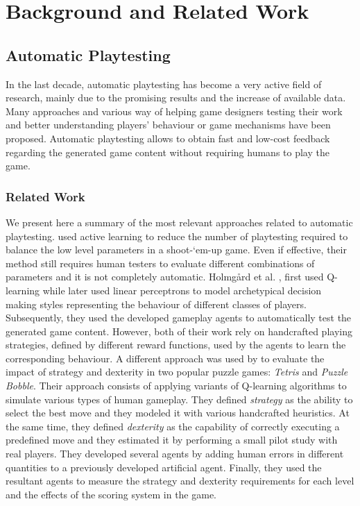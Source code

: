 \chapter{Background and Related Work}
\label{chap:background}
\section{Automatic Playtesting}
In the last decade, automatic playtesting has become a very active field of research, mainly due to the promising results and the increase of available data. Many approaches and various way of helping game designers testing their work and better understanding players' behaviour or game mechanisms have been proposed. Automatic playtesting allows to obtain fast and low-cost feedback regarding the generated game content without requiring humans to play the game.

\subsection{Related Work} \label{Automatic Playtesting Related Work}
We present here a summary of the most relevant approaches related to automatic playtesting. \textcite{zook_automatic_2014} used active learning to reduce the number of playtesting required to balance the low level parameters in a shoot-‘em-up game. Even if effective, their method still requires human testers to evaluate different combinations of parameters and it is not completely automatic. Holmgård et al. \cite{holmgard_evolving_2014}, first used Q-learning while later \cite{holmgard_evolving_2016} used linear perceptrons  to model archetypical decision making styles representing the behaviour of different classes of players. Subsequently, they used the developed gameplay agents to automatically test the generated game content. However, both of their work rely on handcrafted playing strategies, defined by different reward functions, used by the agents to learn the corresponding behaviour. A different approach was used by \textcite{isaksen_simulating_2017} to evaluate the impact of strategy and dexterity in two popular puzzle games: \textit{Tetris} and \textit{Puzzle Bobble}. Their approach consists of applying variants of Q-learning algorithms to simulate various types of human gameplay. They defined \textit{strategy} as the ability to select the best move and they modeled it with various handcrafted heuristics. At the same time, they defined \textit{dexterity} as the capability of correctly executing a predefined move and they estimated it by performing a small pilot study with real players. They developed several agents by adding human errors in different quantities to a previously developed artificial agent. Finally, they used the resultant agents to measure the strategy and dexterity requirements for each level and the effects of the scoring system in the game.  


